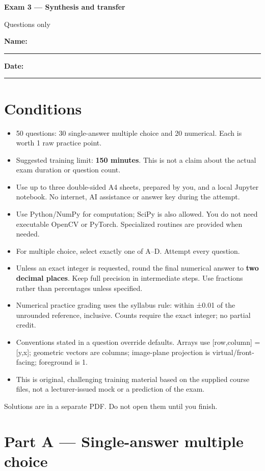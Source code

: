 \documentclass[11pt,a4paper]{article}
\begin{document}
{\LARGE\bfseries Exam 3 — Synthesis and transfer}\par
{\large Questions only}\par\bigskip
\textbf{Name:} \rule{70mm}{0.4pt}\hfill \textbf{Date:} \rule{30mm}{0.4pt}
\section*{Conditions}
\begin{itemize}[leftmargin=5mm,itemsep=5pt]
\item 50 questions: 30 single-answer multiple choice and 20 numerical. Each is worth 1 raw practice point.
\item Suggested training limit: \textbf{150 minutes}. This is not a claim about the actual exam duration or question count.
\item Use up to three double-sided A4 sheets,\allowbreak{} prepared by you,\allowbreak{} and a local Jupyter notebook. No internet,\allowbreak{} AI assistance or answer key during the attempt.
\item Use Python/\allowbreak{}NumPy for computation; SciPy is also allowed. You do not need executable OpenCV or PyTorch. Specialized routines are provided when needed.
\item For multiple choice,\allowbreak{} select exactly one of A–D. Attempt every question.
\item Unless an exact integer is requested,\allowbreak{} round the final numerical answer to \textbf{two decimal places}. Keep full precision in intermediate steps. Use fractions rather than percentages unless specified.
\item Numerical practice grading uses the syllabus rule: within ±0.01 of the unrounded reference,\allowbreak{} inclusive. Counts require the exact integer; no partial credit.
\item Conventions stated in a question override defaults. Arrays use [row,\allowbreak{}column] =\allowbreak{} [y,\allowbreak{}x]; geometric vectors are columns; image-plane projection is virtual/\allowbreak{}front-facing; foreground is 1.
\item This is original,\allowbreak{} challenging training material based on the supplied course files,\allowbreak{} not a lecturer-issued mock or a prediction of the exam.
\end{itemize}
Solutions are in a separate PDF. Do not open them until you finish.
\clearpage\section*{Part A — Single-answer multiple choice}
\end{document}
